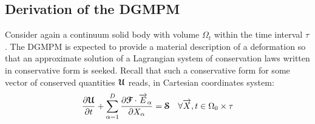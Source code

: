 

\subsection{Derivation of the DGMPM}
Consider again a continuum solid body with volume $\Omega_t$ within the time interval $\tau$. The DGMPM is expected to provide a material description of a deformation so that an approximate solution of a Lagrangian system of conservation laws written in conservative form is seeked. Recall that such a conservative form for some vector of conserved quantities ${\boldsymbol{\mathcal{U}}}$ reads, in Cartesian coordinates system:
\begin{equation}
  \label{eq:conservative_form}
  \frac{\partial {\boldsymbol{\mathcal{U}}}}{\partial t} + \sum_{\alpha=1}^D \frac{\partial {\boldsymbol{\mathcal{F}}}\cdot {\overrightarrow{E}}_\alpha}{\partial X_\alpha} = {\boldsymbol{\mathcal{S}}} \quad \forall {\overrightarrow{X}},t \in \Omega_0 \times \tau
\end{equation}
